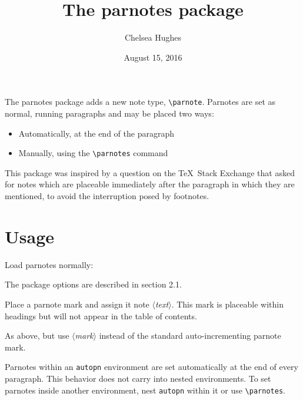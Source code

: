 \documentclass[10pt]{article}
\title{The \textsf{parnotes} package\parnote{This is rev.~3, last modified 8/15/2016.}}
\author{Chelsea Hughes\parnote{See \texttt{parnotes.sty} for copyright and contact details.}}
\date{August 15, 2016}
\begin{document}
\maketitle
\parnotes
The \textsf{parnotes} package adds a new note type, \verb+\parnote+. Parnotes are set as normal, running paragraphs and may be placed two ways:
\begin{itemize}
\item Automatically, at the end of the paragraph
\item Manually, using the \verb+\parnotes+ command
\end{itemize}
This package was inspired by a question on the \TeX\ Stack Exchange that asked for notes
which are placeable immediately after the paragraph in which they are mentioned, to avoid
the interruption posed by footnotes.

\parnotes
\bigskip
\section{Usage}
Load parnotes normally:

\medskip{}

\medskip\noindent The package options are described in section 2.1.

\medskip{}

\medskip\noindent Place a parnote mark and assign it note $\langle$\textit{text}$\rangle$. This mark is placeable within headings but will not appear in the table of contents.

\medskip{}

\medskip\noindent As above, but use $\langle$\textit{mark}$\rangle$ instead of the standard auto-incrementing parnote mark.

\medskip{}

\medskip\noindent Parnotes within an \texttt{autopn} environment are set automatically at the end of every paragraph. This behavior does not carry into nested environments. To set parnotes inside another environment, nest \texttt{autopn} within it or use \verb+\parnotes+.
\end{document}
